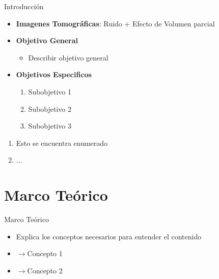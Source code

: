 \documentclass{beamer}
\begin{document}
\begin{frame}{Introducción}

    \begin{block}{}
    \end{block}{} 
    
       \begin{itemize}
            \item[] \textbf{Imagenes Tomográficas}: Ruido + Efecto de Volumen parcial
        \pause
            \item [] \textbf{Objetivo General}
        \begin{itemize}
            \item Describir objetivo general
        \end{itemize}
        \end{itemize}
        \pause
        \begin{itemize}
            \item [] \textbf{Objetivos Especificos}
            \begin{enumerate}
                \item Subobjetivo 1
                \item Subobjetivo 2
                \item Subobjetivo 3
            \end{enumerate}
        \end{itemize}
       \begin{enumerate}
           \item Esto se encuentra enumerado
           \item ...
       \end{enumerate}
       
       
\end{frame}

\section{Marco Teórico}
    \begin{frame}{Marco Teórico}
        \begin{itemize}
            \item Explica los conceptos necesarios para entender el contenido
            \item [] $\longrightarrow$Concepto 1
            \item [] $\longrightarrow$Concepto 2
        \end{itemize}
     \end{frame}
     
\end{document}
